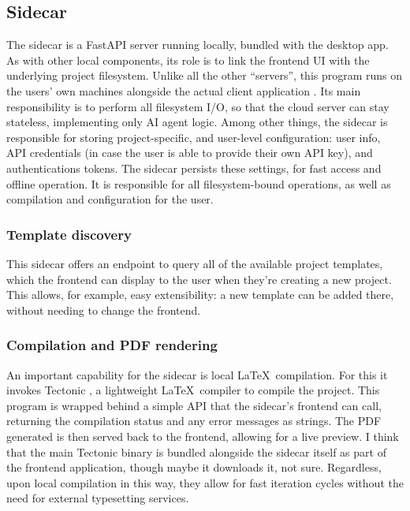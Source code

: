 \subsection{Sidecar}
The sidecar is a FastAPI server \cite{fastapi} running locally, bundled with the desktop app.
As with other local components, its role is to link the frontend UI with the underlying project filesystem.
Unlike all the other “servers”, this program runs on the users' own machines alongside the actual client application \cite{tauri_sidecar}.
Its main responsibility is to perform all filesystem I/O, so that the cloud server can stay stateless, implementing only AI agent logic.
Among other things, the sidecar is responsible for storing project-specific, and user-level configuration: user info, API credentials (in case the user is able to provide their own API key), and authentications tokens.
The sidecar persists these settings, for fast access and offline operation.
It is responsible for all filesystem-bound operations, as well as compilation and configuration for the user.

\subsubsection{Template discovery}
This sidecar offers an endpoint to query all of the available project templates, which the frontend can display to the user when they're creating a new project.
This allows, for example, easy extensibility: a new template can be added there, without needing to change the frontend.

\subsubsection{Compilation and PDF rendering}
An important capability for the sidecar is local \LaTeX\ compilation.
For this it invokes Tectonic \cite{tectonic}, a lightweight \LaTeX\ compiler to compile the project.
This program is wrapped behind a simple API that the sidecar's frontend can call, returning the compilation status and any error messages as strings.
The PDF generated is then served back to the frontend, allowing for a live preview.
I think that the main Tectonic binary is bundled alongside the sidecar itself as part of the frontend application, though maybe it downloads it, not sure.
Regardless, upon local compilation in this way, they allow for fast iteration cycles without the need for external typesetting services.

